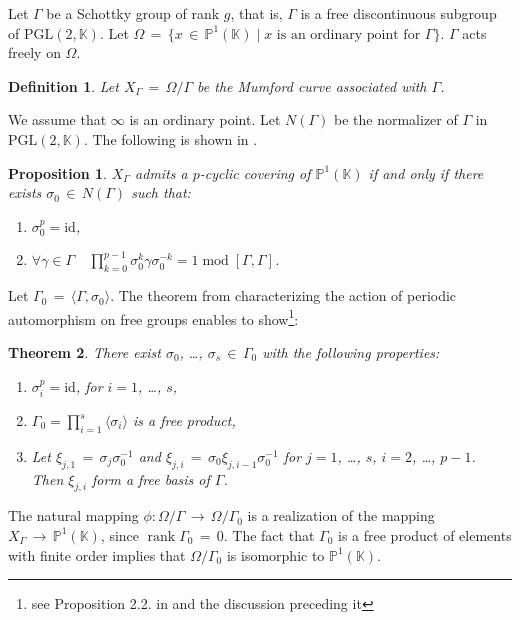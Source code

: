 \documentclass[]{amsart}
\numberwithin{equation}{section}
\newtheorem{theorem}{Theorem}[section]
\newtheorem{proposition}[theorem]{Proposition}
\newtheorem{definition}{Definition}[section]
\newcommand{\id}{\mathrm{id}}
\DeclareMathOperator{\modOp}{mod}
\DeclareMathOperator{\rank}{rank}
\begin{document}
Let $\Gamma$ be a Schottky group of rank $g$, that is, $\Gamma$ is a free discontinuous subgroup of 
$\mathrm{PGL}(2,\mathbb{K})$. Let $\Omega\,{=}\,\{x \,{\in}\, \mathbb{P}^{1}(\mathbb{K}) \mid 
x \text{ is an ordinary point for } \Gamma \}$. 
$\Gamma$ acts freely on $\Omega$.
\begin{definition}
Let $X_{\Gamma}\,{=}\,\Omega/\Gamma$ be the Mumford curve associated with $\Gamma$. 
\end{definition}
We assume that $\infty$ is an ordinary point. Let $N(\Gamma)$ 
be the normalizer of $\Gamma$ in $\mathrm{PGL}(2,\mathbb{K})$. 
The following is shown in \cite{V1,V2}.
\begin{proposition}\label{Pgamma0}
$X_{\Gamma}$ admits a $p$-cyclic covering of $\mathbb{P}^{1}(\mathbb{K})$ 
if and only if there exists $\sigma_0\,{\in}\, N(\Gamma)$ such that: 
\begin{enumerate}
\item $\sigma_0^p= \id$,
\item $\forall \gamma \in \Gamma$\ \ 
$\prod_{k=0}^{p-1} \sigma_0^k \gamma \sigma_0^{-k}=1\modOp [\Gamma,\Gamma]$.
\end{enumerate}
\end{proposition}
 Let $\Gamma_0 \,{=}\,\langle \Gamma,\sigma_0\rangle$. 
The theorem from \cite{DS75} characterizing the action of periodic automorphism on 
 free groups enables \cite{V2} to show\footnote{ see Proposition 2.2. in \cite{V2} and the discussion preceding it}: 
\begin{theorem}\label{T:sGenIntro}
There exist $\sigma_0$, \ldots, $\sigma_s \,{\in}\, \Gamma_0$ with the following properties: 
\begin{enumerate}
\item $\sigma_i^p = \id$, for $i=1$, \ldots, $s$,
\item $\Gamma_0 = \prod_{i=1}^s \langle \sigma_i\rangle $ is a free product,
\item Let $\xi_{j,1} \,{=}\, \sigma_j \sigma_0^{-1}$ and  $\xi_{j,i} \,{=}\, \sigma_0 \xi_{j,i-1} \sigma_0^{-1}$ for 
$j=1$, \ldots, $s$, $i=2$, \ldots, $p-1$. Then $\xi_{j,i}$ form a free basis of $\Gamma$.
\end{enumerate}
\end{theorem}
The natural mapping $\phi:\Omega/\Gamma \,{\to}\, \Omega/\Gamma_0$ is a realization of the mapping 
$X_\Gamma \,{\to}\, \mathbb{P}^{1}(\mathbb{K})$, since  $\rank \Gamma_0\,{=}\,0$.
The fact that $\Gamma_0$ is a free product of elements with finite order implies 
that $\Omega/\Gamma_0$ is isomorphic to $\mathbb{P}^{1}(\mathbb{K})$.
 
\end{document}
